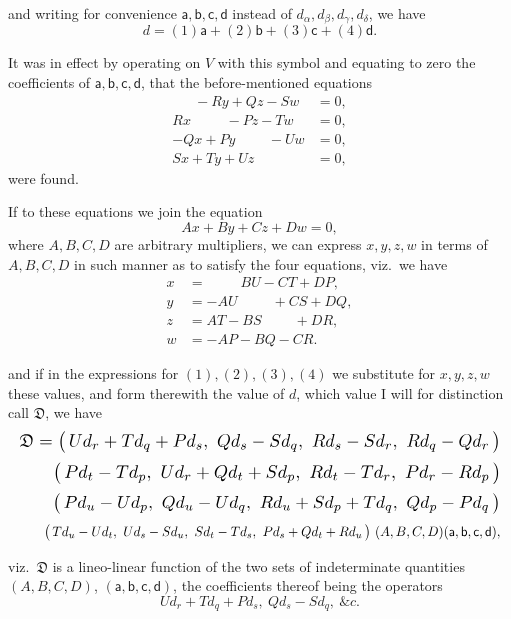 \documentclass[11pt]{article}
\begin{document}
and writing for convenience $\mathsf{a},\mathsf{b},\mathsf{c},\mathsf{d}$ instead of $d_{\alpha},d_{\beta},d_{\gamma},d_{\delta}$, we have
\[ d=(1)\mathsf{a}+(2)\mathsf{b}+(3)\mathsf{c}+(4)\mathsf{d}. \]

It was in effect by operating on $V$ with this symbol and equating to zero the
coefficients of $\mathsf{a},\mathsf{b},\mathsf{c},\mathsf{d}$, that the before-mentioned equations
\[ \begin{aligned}
\phantom{Rx}\ -Ry+Qz-Sw &= 0,\\
Rx\ \phantom{-Ry}\ -Pz-Tw &= 0,\\
-Qx+Py\ \phantom{-Pz}\ -Uw &= 0,\\
Sx+Ty+Uz\ \phantom{-Uw} &= 0,
\end{aligned} \]
were found.

If to these equations we join the equation
\[ Ax+By+Cz+Dw=0, \]
where $A,B,C,D$ are arbitrary multipliers, we can express $x,y,z,w$ in terms of
$A,B,C,D$ in such manner as to satisfy the four equations, viz.\ we have
\[ \begin{aligned}
x &= \phantom{-AU}\ BU-CT+DP,\\
y &= -AU\phantom{-BU}\ +CS+DQ,\\
z &= AT-BS\phantom{-CT}\ +DR,\\
w &= -AP-BQ-CR.
\end{aligned} \]

and if in the expressions for $(1),(2),(3),(4)$ we substitute for $x,y,z,w$ these values,
and form therewith the value of $d$, which value I will for distinction call $\mathfrak{D}$, we have
\[ \resizebox{\textwidth}{!}{$\displaystyle
\mathfrak{D}=\bigl(\,Ud_{r}+Td_{q}+Pd_{s},\ Qd_{s}-Sd_{q},\ Rd_{s}-Sd_{r},\ Rd_{q}-Qd_{r}\,\bigr) $} \]
\[ \resizebox{\textwidth}{!}{$\displaystyle
\phantom{\mathfrak{D}=}\bigl(\,Pd_{t}-Td_{p},\ Ud_{r}+Qd_{t}+Sd_{p},\ Rd_{t}-Td_{r},\ Pd_{r}-Rd_{p}\,\bigr) $} \]
\[ \resizebox{\textwidth}{!}{$\displaystyle
\phantom{\mathfrak{D}=}\bigl(\,Pd_{u}-Ud_{p},\ Qd_{u}-Ud_{q},\ Rd_{u}+Sd_{p}+Td_{q},\ Qd_{p}-Pd_{q}\,\bigr) $} \]
\[ \resizebox{\textwidth}{!}{$\displaystyle
\phantom{\mathfrak{D}=}\bigl(\,Td_{u}-Ud_{t},\ Ud_{s}-Sd_{u},\ Sd_{t}-Td_{s},\ Pd_{s}+Qd_{t}+Rd_{u}\,\bigr)\ (A,B,C,D)(\mathsf{a},\mathsf{b},\mathsf{c},\mathsf{d}), $} \]

viz.\ $\mathfrak{D}$ is a lineo-linear function of the two sets of indeterminate quantities
$(A,B,C,D)$, $(\mathsf{a},\mathsf{b},\mathsf{c},\mathsf{d})$, the coefficients thereof being the operators
\[ Ud_{r}+Td_{q}+Pd_{s},\ Qd_{s}-Sd_{q},\ \&c. \]
\end{document}
